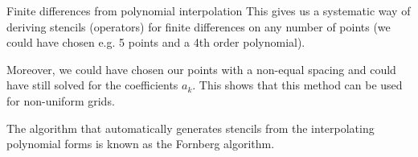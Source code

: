 \begin{frame}{Finite differences from polynomial interpolation}
	This gives us a systematic way of deriving stencils (operators) for finite differences on any number of points (we could have chosen e.g. 5 points and a 4th order polynomial). 
	
	\pause
	Moreover, we could have chosen our points with a non-equal spacing and could have still solved for the coefficients $ a_k $. This shows that this method can be used for non-uniform grids. 
	
	\pause
	The algorithm that automatically generates stencils from the interpolating polynomial forms is known as the Fornberg algorithm.
\end{frame}


